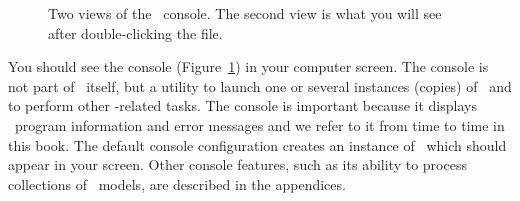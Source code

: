 \begin{numberlist}
\begin{figure}[htb]
  \centering
  \caption{Two views of the \ejs\ console. The second view is what you will see after double-clicking the  file.}
  \label{fig:02EjsIntro/EjsConsole}
\end{figure}

\end{numberlist}

You should see the console (Figure~\ref{fig:02EjsIntro/EjsConsole}) in your computer screen. The console is not part of
\ejs\ itself, but a utility to launch one or several instances (copies) of \ejs\ and to perform other \ejs-related
tasks.  The console is important because it displays \ejs\ program information and error messages and we refer to it
from time to time in this book. The default console configuration creates an instance of \ejs\ which should appear in
your screen. Other console features, such as its ability to process collections of \ejs\ models, are described in the
appendices.

